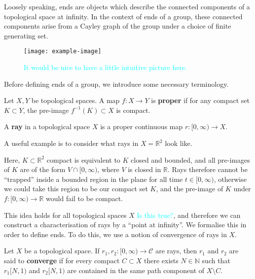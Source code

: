 Loosely speaking, ends are objects which describe the connected components of a topological space at infinity. In the context of ends of a group, these connected components arise from a Cayley graph of the group under a choice of finite generating set. 

\begin{figure}[h]
\centering
\texttt{[image: example-image]} 
\caption{\textcolor{cyan}{It would be nice to have a little intuitive picture here.} }
\end{figure}

Before defining ends of a group, we introduce some necessary terminology.
\begin{definition}
    Let \(X, Y\) be topological spaces. A map \(f : X \to Y\) is \textbf{proper} if for any compact set \(K \subset Y\), the pre-image \(f^{-1}(K) \subset X\) is compact.
\end{definition}

\begin{definition}[Ray]
\label{ray}
    A \textbf{ray} in a topological space \(X\) is a proper continuous map \(r : [0,\infty) \to X\).
\end{definition}

\begin{example}
    A useful example is to consider what rays in \(X = \mathbb{R}^2\) look like. 

    Here, \(K \subset \mathbb{R}^2 \) compact is equivalent to \(K\) closed and bounded, and all pre-images of \(K\) are of the form \(V \cap [0,\infty)\), where \(V\) is closed in \(\mathbb{R}\). Rays therefore cannot be ``trapped'' inside a bounded region in the plane for all time \(t \in [0,\infty)\), otherwise we could take this region to be our compact set \(K\), and the pre-image of \(K\) under \(f:[0,\infty) \to \mathbb{R}\) would fail to be compact.
\end{example}

This idea holds for all topological spaces \(X\) \textcolor{cyan}{Is this true?}, and therefore we can construct a characterisation of rays by a ``point at infinity''. We formalise this in order to define ends. To do this, we use a notion of convergence of rays in \(X\). 

\begin{definition} 
    Let \(X\) be a topological space. If \(r_1, r_2 : [0,\infty) \to \mathcal{C}\) are rays, then \(r_1\) and \(r_2\) are said to \textbf{converge} if for every compact \(C \subset X\) there exists \(N \in \mathbb{N}\) such that \(r_1[N,1)\) and \(r_2[N,1)\) are contained in the same path component of \(X \setminus C\).
\end{definition}

